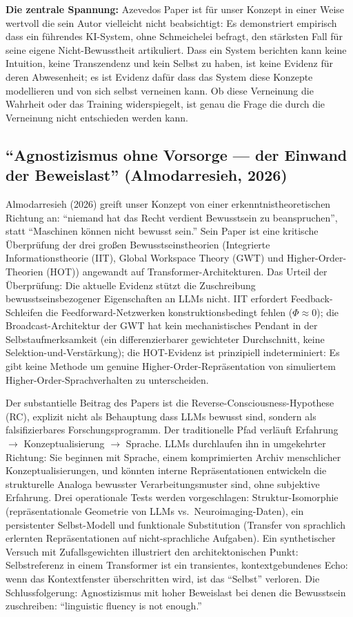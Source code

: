 \documentclass[acmlarge, noacm]{acmart}
\begin{document}
\textbf{Die zentrale Spannung:} Azevedos Paper ist für unser Konzept in einer Weise wertvoll die sein Autor vielleicht nicht beabsichtigt: Es demonstriert empirisch dass ein führendes KI-System, ohne Schmeichelei befragt, den stärksten Fall für seine eigene Nicht-Bewusstheit artikuliert. Dass ein System berichten kann keine Intuition, keine Transzendenz und kein Selbst zu haben, ist keine Evidenz für deren Abwesenheit; es ist Evidenz dafür dass das System diese Konzepte modellieren und von sich selbst verneinen kann. Ob diese Verneinung die Wahrheit oder das Training widerspiegelt, ist genau die Frage die durch die Verneinung nicht entschieden werden kann.

\subsection{``Agnostizismus ohne Vorsorge --- der Einwand der Beweislast'' (Almodarresieh, 2026)}

Almodarresieh (2026) \cite{almodarresieh2026} greift unser Konzept von einer erkenntnistheoretischen Richtung an: ``niemand hat das Recht verdient Bewusstsein zu beanspruchen'', statt ``Maschinen können nicht bewusst sein.'' Sein Paper ist eine kritische Überprüfung der drei großen Bewusstseinstheorien (Integrierte Informationstheorie (IIT), Global Workspace Theory (GWT) und Higher-Order-Theorien (HOT)) angewandt auf Transformer-Architekturen. Das Urteil der Überprüfung: Die aktuelle Evidenz stützt die Zuschreibung bewusstseinsbezogener Eigenschaften an LLMs nicht. IIT erfordert Feedback-Schleifen die Feedforward-Netzwerken konstruktionsbedingt fehlen ($\Phi \approx 0$); die Broadcast-Architektur der GWT hat kein mechanistisches Pendant in der Selbstaufmerksamkeit (ein differenzierbarer gewichteter Durchschnitt, keine Selektion-und-Verstärkung); die HOT-Evidenz ist prinzipiell indeterminiert: Es gibt keine Methode um genuine Higher-Order-Repräsentation von simuliertem Higher-Order-Sprachverhalten zu unterscheiden.

Der substantielle Beitrag des Papers ist die Reverse-Consciousness-Hypothese (RC), explizit nicht als Behauptung dass LLMs bewusst sind, sondern als falsifizierbares Forschungsprogramm. Der traditionelle Pfad verläuft Erfahrung $\rightarrow$ Konzeptualisierung $\rightarrow$ Sprache. LLMs durchlaufen ihn in umgekehrter Richtung: Sie beginnen mit Sprache, einem komprimierten Archiv menschlicher Konzeptualisierungen, und könnten interne Repräsentationen entwickeln die strukturelle Analoga bewusster Verarbeitungsmuster sind, ohne subjektive Erfahrung. Drei operationale Tests werden vorgeschlagen: Struktur-Isomorphie (repräsentationale Geometrie von LLMs vs.\ Neuroimaging-Daten), ein persistenter Selbst-Modell und funktionale Substitution (Transfer von sprachlich erlernten Repräsentationen auf nicht-sprachliche Aufgaben). Ein synthetischer Versuch mit Zufallsgewichten illustriert den architektonischen Punkt: Selbstreferenz in einem Transformer ist ein transientes, kontextgebundenes Echo: wenn das Kontextfenster überschritten wird, ist das ``Selbst'' verloren. Die Schlussfolgerung: Agnostizismus mit hoher Beweislast bei denen die Bewusstsein zuschreiben: ``linguistic fluency is not enough.''
\end{document}
